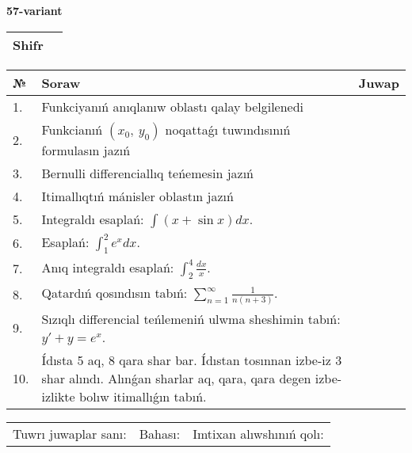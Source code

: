 \documentclass{article}
\begin{document}
  \egroup
  
  \newpage
  
  
  \textbf{57-variant}\\
  
  \bgroup
  \def\arraystretch{1.6} %
  
  \begin{tabular}{|m{5.7cm}|m{9.5cm}|}
  \hline
  Shifr & \\
  \hline
  \end{tabular}
  
  \vspace{1cm}
  
  \begin{tabular}{|m{0.7cm}|m{10cm}|m{4cm}|}
  \hline
  № & Soraw & Juwap \\
  \hline
  1. & Funkciyanıń anıqlanıw oblastı qalay belgilenedi &  \\
  \hline
  2. & Funkcianıń \((x_{0},\ y_{0})\) noqattaǵı tuwındısınıń formulasın jazıń &  \\
  \hline
  3. & Bernulli differenciallıq teńemesin jazıń &  \\
  \hline
  4. & Itimallıqtıń mánisler oblastın jazıń &  \\
  \hline
  5. & Integraldı esaplań: \(\int{(x + \sin x)dx}\). &  \\
  \hline
  6. & Esaplań: \(\int_{1}^2 {e^{x}dx}\). &  \\
  \hline
  7. & Anıq integraldı esaplań: \(\int_{2}^{4}\frac{dx}{x}\). &  \\
  \hline
  8. & Qatardıń qosındısın tabıń: \(\sum_{n = 1}^{\infty}\frac{1}{n(n + 3)}\). &  \\
  \hline
  9. & Sızıqlı differencial teńlemeniń ulwma sheshimin tabıń: \(y' + y = e^{x}\). &  \\
  \hline
  10. & Ídısta 5 aq, 8 qara shar bar. Ídıstan tosınnan izbe-iz 3 shar alındı. Alınǵan sharlar aq, qara, qara degen izbe-izlikte bolıw itimallıǵın tabıń. &  \\
  \hline
  \end{tabular}
  
  \vspace{1cm}
  
  \begin{tabular}{lll}
  Tuwrı juwaplar sanı: \underline{\hspace{1.5cm}} & 
  Bahası: \underline{\hspace{1.5cm}} & 
  Imtixan alıwshınıń qolı: \underline{\hspace{2cm}} \\
  \end{tabular}
  
\end{document}
